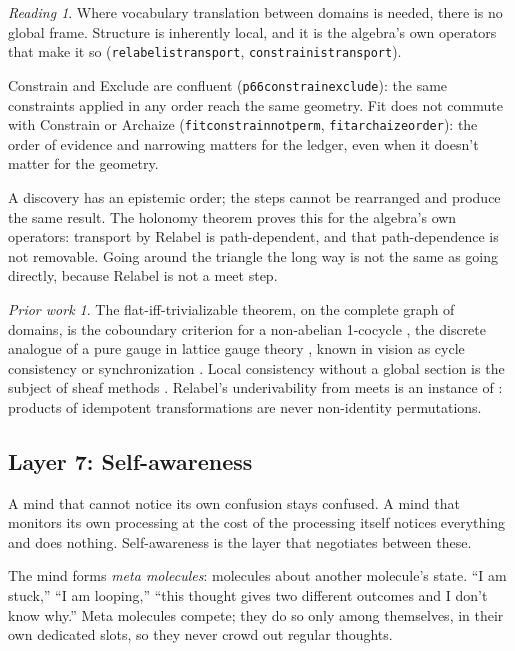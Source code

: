 \documentclass[11pt]{article}
\newcommand{\leanus}{\textunderscore\allowbreak}
\newcommand{\lean}[1]{{\let\_\leanus\texttt{#1}}}
\theoremstyle{remark}
\newtheorem*{reading}{Reading}
\newtheorem*{prior}{Prior work}
\begin{document}
\begin{reading}
Where vocabulary translation between domains is needed, there is no global frame.
Structure is inherently local, and it is the algebra's own operators that make it so (\lean{relabel\_is\_transport}, \lean{constrain\_is\_transport}).

Constrain and Exclude are confluent (\lean{p66\_constrain\_exclude}): the same constraints
applied in any order reach the same geometry. Fit does not commute with Constrain or
Archaize (\lean{fit\_constrain\_not\_perm}, \lean{fit\_archaize\_order}): the order of
evidence and narrowing matters for the ledger, even when it doesn't matter for the
geometry.

A discovery has an epistemic order; the steps cannot be rearranged and produce the same
result. The holonomy theorem proves this for the algebra's own operators: transport by
Relabel is path-dependent, and that path-dependence is not removable. Going around the
triangle the long way is not the same as going directly, because Relabel is not a meet
step.
\end{reading}

\begin{prior}
The flat-iff-trivializable theorem, on the complete graph of domains, is the coboundary
criterion for a non-abelian 1-cocycle \citep{Giraud1971}, the discrete analogue of a pure
gauge in lattice gauge theory \citep{Wilson1974}, known in vision as cycle consistency or
synchronization \citep{Singer2011,PachauriKondorSingh2013,HuangGuibas2013,GaoBrodzkiMukherjee2021}. Local consistency without a
global section is the subject of sheaf methods
\citep{HansenGhrist2019,AbramskyBrandenburger2011}. Relabel's underivability from meets
is an instance of \citet{Howie1966}: products of idempotent transformations are never
non-identity permutations.
\end{prior}

\subsection{Layer 7: Self-awareness}

A mind that cannot notice its own confusion stays confused. A mind that monitors its own
processing at the cost of the processing itself notices everything and does nothing.
Self-awareness is the layer that negotiates between these.

The mind forms \emph{meta molecules}: molecules about another molecule's state. ``I am
stuck,'' ``I am looping,'' ``this thought gives two different outcomes and I don't know
why.'' Meta molecules compete; they do so only among themselves, in their own dedicated slots,
so they never crowd out regular thoughts.
\end{document}

